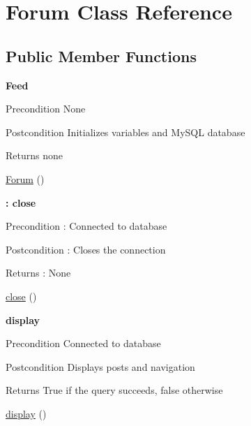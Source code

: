 \hypertarget{class_forum}{}\section{Forum Class Reference}
\label{class_forum}
\subsection*{Public Member Functions}
\begin{Indent}{\bf Feed}\par
{\em \begin{DoxyPrecond}{Precondition}
None 
\end{DoxyPrecond}
\begin{DoxyPostcond}{Postcondition}
Initializes variables and My\+S\+QL database 
\end{DoxyPostcond}
\begin{DoxyReturn}{Returns}
none 
\end{DoxyReturn}
}\begin{DoxyCompactItemize}
\item 
\hyperlink{class_forum_a059305e1577aeceaae54fa16bbef042a}{Forum} ()
\end{DoxyCompactItemize}
\end{Indent}
\begin{Indent}{\bf \+: close}\par
{\em \begin{DoxyPrecond}{Precondition}
\+: Connected to database 
\end{DoxyPrecond}
\begin{DoxyPostcond}{Postcondition}
\+: Closes the connection 
\end{DoxyPostcond}
\begin{DoxyReturn}{Returns}
\+: None 
\end{DoxyReturn}
}\begin{DoxyCompactItemize}
\item 
\hyperlink{class_forum_aa69c8bf1f1dcf4e72552efff1fe3e87e}{close} ()
\end{DoxyCompactItemize}
\end{Indent}
\begin{Indent}{\bf display}\par
{\em \begin{DoxyPrecond}{Precondition}
Connected to database 
\end{DoxyPrecond}
\begin{DoxyPostcond}{Postcondition}
Displays posts and navigation 
\end{DoxyPostcond}
\begin{DoxyReturn}{Returns}
True if the query succeeds, false otherwise 
\end{DoxyReturn}
}\begin{DoxyCompactItemize}
\item 
\hyperlink{class_forum_a0b9b6e6acd4a839fc7c2f26f96b5cfa8}{display} ()
\end{DoxyCompactItemize}
\end{Indent}


